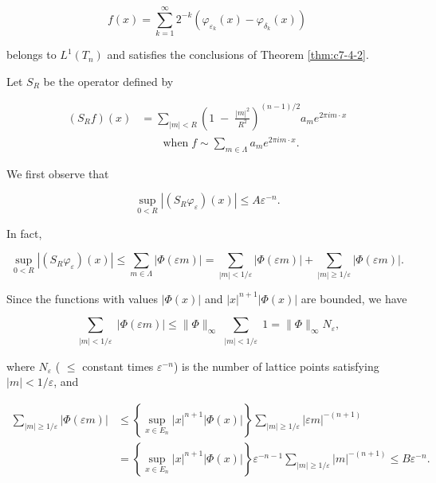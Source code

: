 \begin{equation}\label{eq:c7-4-20}
f(x)=\sum_{k=1}^{\infty}2^{-k}(\varphi_{\varepsilon_{k}}(x)-\varphi_{\delta_{k}}(x))
\end{equation}

belongs to $L^{1}(T_{n})$ and satisfies the conclusions of Theorem \ref{thm:c7-4-2}.

Let $S_{R}$ be the operator defined by

\[
\begin{aligned}(S_{R}f)(x)&=\sum_{|m|<R}\left(1\;-\;\frac{|m|^{2}}{R^{2}}\right)^{(n-1)/2}a_{m}e^{2\pi i m\cdot x}\\&\qquad\text{when}\;f\sim\sum_{m\in\Lambda}a_{m}e^{2\pi i m\cdot x}.\end{aligned}
\]

We first observe that

\begin{equation}\label{eq:c7-4-21}
\sup_{0<R}|(S_{R}\varphi_{\varepsilon})(x)|\leq A\varepsilon^{-n}.
\end{equation}

In fact,

\[
\sup_{0<R}|(S_{R}\varphi_{\varepsilon})(x)|\leq\sum_{m\in\Lambda}|\Phi(\varepsilon m)|=\sum_{|m|<1/\varepsilon}|\Phi(\varepsilon m)|+\sum_{|m|\geq1/\varepsilon}|\Phi(\varepsilon m)|.
\]

Since the functions with values $|\Phi(x)|$ and $|x|^{n+1}|\Phi(x)|$ are bounded, we have

\begin{equation}
\tag{i}
\sum_{\substack{|m|<1/\varepsilon}}\left|\Phi(\varepsilon m)\right|\leq\|\Phi\|_{\infty}\sum_{\substack{|m|<1/\varepsilon}}1=\|\Phi\|_{\infty}N_{\varepsilon},
\end{equation}

where $N_\varepsilon$ ( $\leq$ constant times $\varepsilon^{-n}$) is the number of lattice points satisfying $|m| < 1/\varepsilon$, and

\begin{equation}
\tag{ii}
\begin{aligned}\sum_{|m|\geq1/\varepsilon}\left|\Phi(\varepsilon m)\right|&\leq\left\{\sup_{x\in E_{n}}\left|x\right|^{n+1}\left|\Phi(x)\right|\right\}\sum_{|m|\geq1/\varepsilon}\left|\varepsilon m\right|^{-(n+1)}\\&=\left\{\sup_{x\in E_{n}}\left|x\right|^{n+1}\left|\Phi(x)\right|\right\}\varepsilon^{-n-1}\sum_{|m|\geq1/\varepsilon}\left|m\right|^{-(n+1)}\leq B\varepsilon^{-n}.\end{aligned}
\end{equation}

